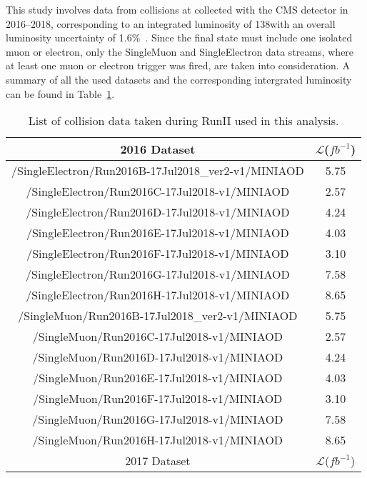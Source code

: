 This study involves data from \pp collisions at \newTeV collected with the CMS detector in 2016--2018, corresponding to an integrated luminosity of 138\fbinv with an overall luminosity uncertainty of 1.6\%~\cite{CMS:lumi2016, CMS:lumi2017, CMS:lumi2018}.
Since the final state must include one isolated muon or electron, only the SingleMuon and SingleElectron data streams, where at least one muon or electron trigger was fired, are taken into consideration.
A summary of all the used datasets and the corresponding intergrated luminosity can be found in Table~\ref{tab:data_list}.

\begin{table}
    \caption{List of \newTeV collision data taken during RunII used in this analysis.}
    \label{tab:data_list}
    \centering\renewcommand{}
    \begin{tabular}{cc}
        \hline 
        2016 Dataset & $\mathcal{L}$($fb^{-1}$) \\
        \hline
        /SingleElectron/Run2016B-17Jul2018\_ver2-v1/MINIAOD  & 5.75 \\
        /SingleElectron/Run2016C-17Jul2018-v1/MINIAOD       & 2.57 \\
        /SingleElectron/Run2016D-17Jul2018-v1/MINIAOD       & 4.24 \\
        /SingleElectron/Run2016E-17Jul2018-v1/MINIAOD       & 4.03 \\
        /SingleElectron/Run2016F-17Jul2018-v1/MINIAOD       & 3.10 \\
        /SingleElectron/Run2016G-17Jul2018-v1/MINIAOD       & 7.58 \\
        /SingleElectron/Run2016H-17Jul2018-v1/MINIAOD       & 8.65 \\
        \hline
        /SingleMuon/Run2016B-17Jul2018\_ver2-v1/MINIAOD      & 5.75 \\
        /SingleMuon/Run2016C-17Jul2018-v1/MINIAOD           & 2.57 \\
        /SingleMuon/Run2016D-17Jul2018-v1/MINIAOD           & 4.24 \\
        /SingleMuon/Run2016E-17Jul2018-v1/MINIAOD           & 4.03 \\
        /SingleMuon/Run2016F-17Jul2018-v1/MINIAOD           & 3.10 \\
        /SingleMuon/Run2016G-17Jul2018-v1/MINIAOD           & 7.58 \\
        /SingleMuon/Run2016H-17Jul2018-v1/MINIAOD           & 8.65 \\
        \hline
        2017 Dataset & $\mathcal{L}$($fb^{-1}$) \\

\end{tabular}
\end{table}
